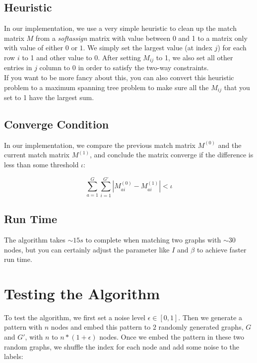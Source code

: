 \subsection{Heuristic}

In our implementation, we use a very simple heuristic to clean up the match matrix $M$ from a \emph{softassign} matrix with value between 0 and 1 to a matrix only with value of either $0$ or $1$. We simply set the largest value (at index $j$) for each row $i$ to 1 and other value to 0. After setting $M_{ij}$ to 1, we also set all other entries in $j$ column to 0 in order to satisfy the two-way constraints.\\

If you want to be more fancy about this, you can also convert this heuristic problem to a maximum spanning tree problem to make sure all the $M_{ij}$ that you set to 1 have the largest sum.

\subsection{Converge Condition}

In our implementation, we compare the previous match matrix $M^{(0)}$ and the current match matrix $M^{(1)}$, and conclude the matrix converge if the difference is less than some threshold $\iota$:

\begin{equation} 
\sum_{a=1}^{G}\sum_{i=1}^{G'}|M_{ai}^{(0)}-M_{ai}^{(1)}|<\iota
\end{equation}

\subsection{Run Time}
\label{ssec:graphmatchingruntime}

The algorithm takes $\sim15s$ to complete when matching two graphs with $\sim30$ nodes, but you can certainly adjust the parameter like $I$ and $\beta$ to achieve faster run time.

\section{Testing the Algorithm}
\label{sec:graphmatchingtest}

To test the algorithm, we first set a noise level $\epsilon \in [0,1]$. Then we generate a pattern with $n$ nodes and embed this pattern to $2$ randomly generated graphs, $G$ and $G'$, with $n$ to $n*(1+\epsilon)$ nodes. Once we embed the pattern in these two random graphs, we shuffle the index for each node and add some noise to the labels:

